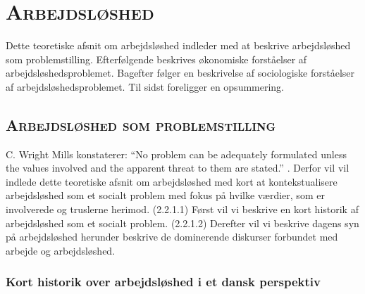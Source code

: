 
\newpage \section{\textsc{Arbejdsløshed \label{}}}

Dette teoretiske afsnit om arbejdsløshed indleder med at beskrive arbejdsløshed som problemstilling. Efterfølgende beskrives økonomiske forståelser af arbejdsløshedsproblemet. Bagefter følger en beskrivelse af sociologiske forståelser af arbejdsløshedsproblemet. Til sidst foreligger en opsummering. 


\subsection{\textsc{Arbejdsløshed som problemstilling}}

C. Wright Mills konstaterer: “No problem can be adequately formulated unless the values involved and the apparent threat to them are stated.” \parencite[129]{Mills1959}. Derfor vil vil indlede dette teoretiske afsnit om arbejdsløshed med kort at kontekstualisere arbejdsløshed som et socialt problem med fokus på hvilke værdier, som er involverede og truslerne herimod. (2.2.1.1) Først vil vi beskrive en kort historik af arbejdsløshed som et socialt problem. (2.2.1.2) Derefter vil vi beskrive dagens syn på arbejdsløshed herunder beskrive de dominerende diskurser forbundet med arbejde og arbejdsløshed. %


\subsubsection{Kort historik over arbejdsløshed i et dansk perspektiv}

